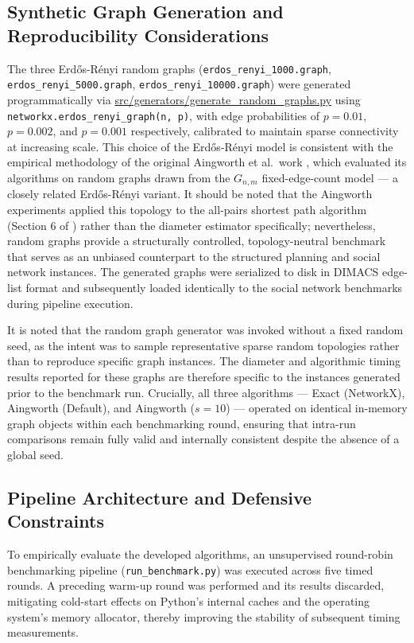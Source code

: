 \subsection{Synthetic Graph Generation and Reproducibility Considerations}
\label{subsec:synthetic}
The three Erdős-Rényi random graphs (\texttt{erdos\_renyi\_1000.graph}, \texttt{erdos\_renyi\_5000.graph}, \texttt{erdos\_renyi\_10000.graph}) were generated programmatically via \url{src/generators/generate_random_graphs.py} using \texttt{networkx.erdos\_renyi\_graph(n,~p)}, with edge probabilities of $p = 0.01$, $p = 0.002$, and $p = 0.001$ respectively, calibrated to maintain sparse connectivity at increasing scale. This choice of the Erdős-Rényi model is consistent with the empirical methodology of the original Aingworth et al.\ work \cite{aingworth96}, which evaluated its algorithms on random graphs drawn from the $G_{n,m}$ fixed-edge-count model --- a closely related Erdős-Rényi variant. It should be noted that the Aingworth experiments applied this topology to the all-pairs shortest path algorithm (Section 6 of \cite{aingworth96}) rather than the diameter estimator specifically; nevertheless, random graphs provide a structurally controlled, topology-neutral benchmark that serves as an unbiased counterpart to the structured planning and social network instances. The generated graphs were serialized to disk in DIMACS edge-list format and subsequently loaded identically to the social network benchmarks during pipeline execution.
 
It is noted that the random graph generator was invoked without a fixed random seed, as the intent was to sample representative sparse random topologies rather than to reproduce specific graph instances. The diameter and algorithmic timing results reported for these graphs are therefore specific to the instances generated prior to the benchmark run. Crucially, all three algorithms — Exact (NetworkX), Aingworth (Default), and Aingworth ($s = 10$) — operated on identical in-memory graph objects within each benchmarking round, ensuring that intra-run comparisons remain fully valid and internally consistent despite the absence of a global seed.

\subsection{Pipeline Architecture and Defensive Constraints}
\label{subsec:pipeline}
To empirically evaluate the developed algorithms, an unsupervised round-robin benchmarking pipeline (\texttt{run\_benchmark.py}) was executed across five timed rounds. A preceding warm-up round was performed and its results discarded, mitigating cold-start effects on Python's internal caches and the operating system's memory allocator, thereby improving the stability of subsequent timing measurements.
 
